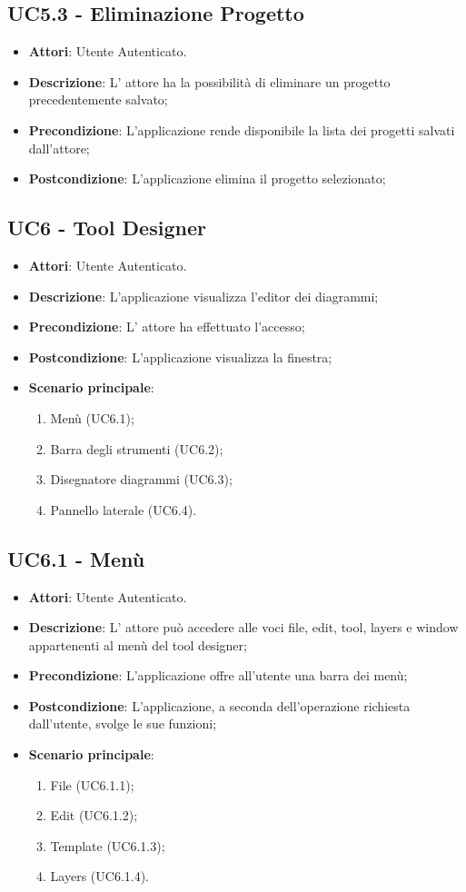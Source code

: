 \subsection{UC5.3 - Eliminazione Progetto} 
\label{ssec:UC5.3} 
\begin{itemize} 
\item \textbf{Attori}: Utente Autenticato.
\item \textbf{Descrizione}: L' attore ha la possibilità di eliminare un progetto precedentemente salvato;
\item \textbf{Precondizione}: L’applicazione rende disponibile la lista dei progetti salvati dall'attore;
\item \textbf{Postcondizione}: L’applicazione elimina il progetto selezionato;
\end{itemize} 
\subsection{UC6 - Tool Designer} 
\label{ssec:UC6} 
\begin{itemize} 
\item \textbf{Attori}: Utente Autenticato.
\item \textbf{Descrizione}: L'applicazione visualizza l'editor dei diagrammi;
\item \textbf{Precondizione}: L' attore ha effettuato l'accesso;
\item \textbf{Postcondizione}: L'applicazione visualizza la finestra;
\item \textbf{Scenario principale}: \begin{enumerate}\item Menù (UC6.1);\item Barra degli strumenti (UC6.2);\item Disegnatore diagrammi (UC6.3);\item Pannello laterale (UC6.4). 
 \end{enumerate}
\end{itemize} 
\subsection{UC6.1 - Menù} 
\label{ssec:UC6.1} 
\begin{itemize} 
\item \textbf{Attori}: Utente Autenticato.
\item \textbf{Descrizione}: L’ attore può accedere alle voci file, edit, tool,
layers e window appartenenti al menù del tool designer;
\item \textbf{Precondizione}: L’applicazione offre all’utente una barra dei menù;
\item \textbf{Postcondizione}: L’applicazione, a seconda dell’operazione richiesta dall’utente,
svolge le sue funzioni;
\item \textbf{Scenario principale}: \begin{enumerate}\item File (UC6.1.1);\item Edit (UC6.1.2);\item Template (UC6.1.3);\item Layers (UC6.1.4). 
 \end{enumerate}
\end{itemize} 
